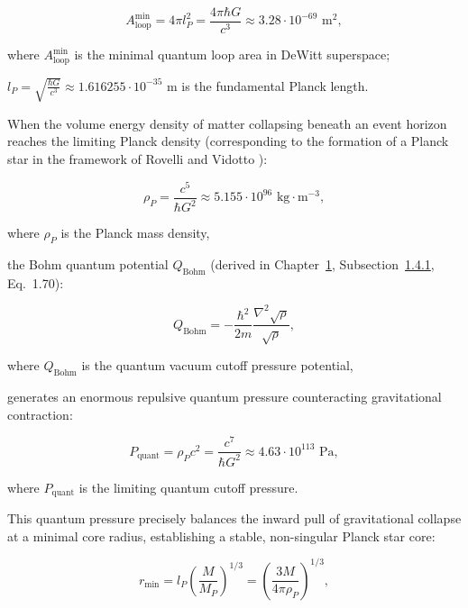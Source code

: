 \documentclass[11pt,a4paper]{article}
\theoremstyle{definition}
\begin{document}
\begin{equation}\label{eq:5.52}\tag{5.52}
A_{\text{loop}}^{\text{min}} = 4\pi l_P^2 = \frac{4\pi \hbar G}{c^3} \approx 3.28 \cdot 10^{-69}\text{ m}^2,
\end{equation}

where $A_{\text{loop}}^{\text{min}}$ is the minimal quantum loop area in DeWitt superspace;  

$l_P = \sqrt{\frac{\hbar G}{c^3}} \approx 1.616255 \cdot 10^{-35}\text{ m}$ is the fundamental Planck length.

When the volume energy density of matter collapsing beneath an event horizon reaches the limiting Planck density (corresponding to the formation of a Planck star in the framework of Rovelli and Vidotto \cite{ref44}):

\begin{equation}\label{eq:5.53}\tag{5.53}
\rho_P = \frac{c^5}{\hbar G^2} \approx 5.155 \cdot 10^{96}\text{ kg}\cdot\text{m}^{-3},
\end{equation}

where $\rho_P$ is the Planck mass density,

the Bohm quantum potential \cite{ref11} $Q_{\text{Bohm}}$ (derived in Chapter~\hyperref[sec:rozdil1]{1}, Subsection~\hyperref[sec:1.4.1]{1.4.1}, Eq.~1.70):

\begin{equation}\label{eq:5.54}\tag{5.54}
Q_{\text{Bohm}} = - \frac{\hbar^2}{2 m} \frac{\nabla^2 \sqrt{\rho}}{\sqrt{\rho}},
\end{equation}

where $Q_{\text{Bohm}}$ is the quantum vacuum cutoff pressure potential,

generates an enormous repulsive quantum pressure counteracting gravitational contraction:

\begin{equation}\label{eq:5.55}\tag{5.55}
P_{\text{quant}} = \rho_P c^2 = \frac{c^7}{\hbar G^2} \approx 4.63 \cdot 10^{113}\text{ Pa},
\end{equation}

where $P_{\text{quant}}$ is the limiting quantum cutoff pressure.

This quantum pressure precisely balances the inward pull of gravitational collapse at a minimal core radius, establishing a stable, non-singular Planck star core:

\begin{equation}\label{eq:5.56}\tag{5.56}
r_{\text{min}} = l_P \left( \frac{M}{M_P} \right)^{1/3} = \left( \frac{3 M}{4\pi \rho_P} \right)^{1/3},
\end{equation}
\end{document}

